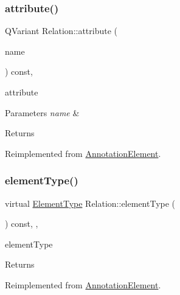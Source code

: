 \subsubsection{\texorpdfstring{attribute()}{attribute()}}
{\footnotesize\ttfamily Q\+Variant Relation\+::attribute (\begin{DoxyParamCaption}\item[{const Q\+String \&}]{name }\end{DoxyParamCaption}) const\hspace{0.3cm}{\ttfamily [override]}, {\ttfamily [virtual]}}



attribute 


\begin{DoxyParams}{Parameters}
{\em name} & \\
\hline
\end{DoxyParams}
\begin{DoxyReturn}{Returns}

\end{DoxyReturn}


Reimplemented from \hyperlink{class_annotation_element_a55f85fb15ed52122653b0769c857899c}{Annotation\+Element}.

\mbox{\label{class_relation_a31e74e5707090aedfa225289b06683f4}} 
\subsubsection{\texorpdfstring{element\+Type()}{elementType()}}
{\footnotesize\ttfamily virtual \hyperlink{class_annotation_element_af5282990ffbe25eeea8ab02037e344b0}{Element\+Type} Relation\+::element\+Type (\begin{DoxyParamCaption}{ }\end{DoxyParamCaption}) const\hspace{0.3cm}{\ttfamily [inline]}, {\ttfamily [override]}, {\ttfamily [virtual]}}



element\+Type 

\begin{DoxyReturn}{Returns}

\end{DoxyReturn}


Reimplemented from \hyperlink{class_annotation_element_a9b2d5cf05a2f81d9b2103a5c736dfb2d}{Annotation\+Element}.

